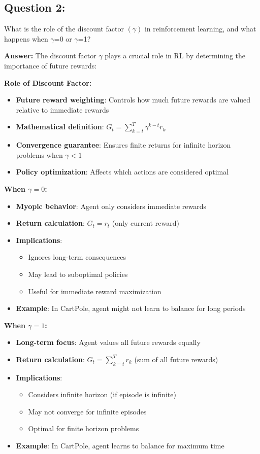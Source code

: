 \documentclass[12pt]{article}
\begin{document}
{{{\subsection{Question 2:}

What is the role of the discount factor $(\gamma)$ in reinforcement learning, and what happens when $\gamma$=0 or $\gamma$=1?
\vspace*{0.3cm}

\textbf{Answer:} The discount factor $\gamma$ plays a crucial role in RL by determining the importance of future rewards:

\textbf{Role of Discount Factor:}
\begin{itemize}
    \item \textbf{Future reward weighting}: Controls how much future rewards are valued relative to immediate rewards
    \item \textbf{Mathematical definition}: $G_t = \sum_{k=t}^{T} \gamma^{k-t} r_k$
    \item \textbf{Convergence guarantee}: Ensures finite returns for infinite horizon problems when $\gamma < 1$
    \item \textbf{Policy optimization}: Affects which actions are considered optimal
\end{itemize}

\textbf{When $\gamma = 0$:}
\begin{itemize}
    \item \textbf{Myopic behavior}: Agent only considers immediate rewards
    \item \textbf{Return calculation}: $G_t = r_t$ (only current reward)
    \item \textbf{Implications}: 
    \begin{itemize}
        \item Ignores long-term consequences
        \item May lead to suboptimal policies
        \item Useful for immediate reward maximization
    \end{itemize}
    \item \textbf{Example}: In CartPole, agent might not learn to balance for long periods
\end{itemize}

\textbf{When $\gamma = 1$:}
\begin{itemize}
    \item \textbf{Long-term focus}: Agent values all future rewards equally
    \item \textbf{Return calculation}: $G_t = \sum_{k=t}^{T} r_k$ (sum of all future rewards)
    \item \textbf{Implications}:
    \begin{itemize}
        \item Considers infinite horizon (if episode is infinite)
        \item May not converge for infinite episodes
        \item Optimal for finite horizon problems
    \end{itemize}
    \item \textbf{Example}: In CartPole, agent learns to balance for maximum time
\end{itemize}

}}}
\end{document}
